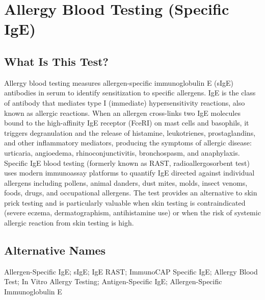 \chapter{Allergy Blood Testing (Specific IgE)}

\section*{What Is This Test?}
Allergy blood testing measures allergen-specific immunoglobulin E (sIgE) antibodies in serum to identify sensitization to specific allergens. IgE is the class of antibody that mediates type I (immediate) hypersensitivity reactions, also known as allergic reactions. When an allergen cross-links two IgE molecules bound to the high-affinity IgE receptor (FceRI) on mast cells and basophils, it triggers degranulation and the release of histamine, leukotrienes, prostaglandins, and other inflammatory mediators, producing the symptoms of allergic disease: urticaria, angioedema, rhinoconjunctivitis, bronchospasm, and anaphylaxis. Specific IgE blood testing (formerly known as RAST, radioallergosorbent test) uses modern immunoassay platforms to quantify IgE directed against individual allergens including pollens, animal danders, dust mites, molds, insect venoms, foods, drugs, and occupational allergens. The test provides an alternative to skin prick testing and is particularly valuable when skin testing is contraindicated (severe eczema, dermatographism, antihistamine use) or when the risk of systemic allergic reaction from skin testing is high.

\section*{Alternative Names}
Allergen-Specific IgE; sIgE; IgE RAST; ImmunoCAP Specific IgE; Allergy Blood Test; In Vitro Allergy Testing; Antigen-Specific IgE; Allergen-Specific Immunoglobulin E

